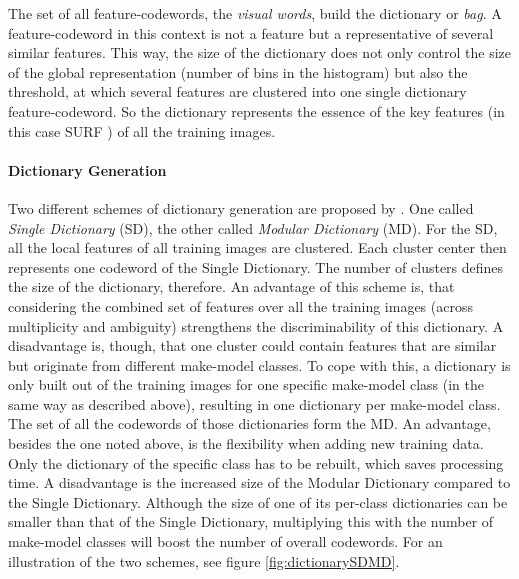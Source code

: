 The set of all feature-codewords, the \emph{visual words}, build the dictionary or \emph{bag}. A feature-codeword in this context is not a feature but a representative of several similar features. This way, the size of the dictionary does not only control the size of the global representation (number of bins in the histogram) but also the threshold, at which several features are clustered into one single dictionary feature-codeword. So the dictionary represents the essence of the key features (in this case SURF \citep{bay2008speeded}) of all the training images.

\paragraph{Dictionary Generation}\label{par:dictionaryGenerationStateOfTheArt}
Two different schemes of dictionary generation are proposed by \citeauthor{siddiqui2015robust}. One called \emph{Single Dictionary} (SD), the other called \emph{Modular Dictionary} (MD). For the SD, all the local features of all training images are clustered. Each cluster center then represents one codeword of the Single Dictionary. The number of clusters defines the size of the dictionary, therefore. An advantage of this scheme is, that considering the combined set of features over all the training images (across multiplicity and ambiguity) strengthens the discriminability of this dictionary. A disadvantage is, though, that one cluster could contain features that are similar but originate from different make-model classes. To cope with this, a dictionary is only built out of the training images for one specific make-model class (in the same way as described above), resulting in one dictionary per make-model class. The set of all the codewords of those dictionaries form the MD. An advantage, besides the one noted above, is the flexibility when adding new training data. Only the dictionary of the specific class has to be rebuilt, which saves processing time. A disadvantage is the increased size of the Modular Dictionary compared to the Single Dictionary. Although the size of one of its per-class dictionaries can be smaller than that of the Single Dictionary, multiplying this with the number of make-model classes will boost the number of overall codewords. For an illustration of the two schemes, see figure \ref{fig:dictionarySDMD}.

